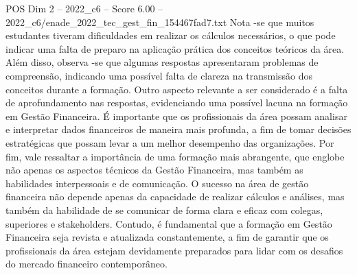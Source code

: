 \begin{textsample}{POS Dim 2 – 2022\_c6 – Score 6.00 – 2022\_c6/enade\_2022\_tec\_gest\_fin\_154467fad7.txt}
Nota -se que muitos estudantes tiveram dificuldades em realizar os cálculos necessários, o que pode indicar uma falta de preparo na aplicação prática dos conceitos teóricos da área.
Além disso, observa -se que algumas respostas apresentaram problemas de compreensão, indicando uma possível falta de clareza na transmissão dos conceitos durante a formação.
Outro aspecto relevante a ser considerado é a falta de aprofundamento nas respostas, evidenciando uma possível lacuna na formação em Gestão Financeira.
É importante que os profissionais da área possam analisar e interpretar dados financeiros de maneira mais profunda, a fim de tomar decisões estratégicas que possam levar a um melhor desempenho das organizações.
Por fim, vale ressaltar a importância de uma formação mais abrangente, que englobe não apenas os aspectos técnicos da Gestão Financeira, mas também as habilidades interpessoais e de comunicação.
O sucesso na área de gestão financeira não depende apenas da capacidade de realizar cálculos e análises, mas também da habilidade de se comunicar de forma clara e eficaz com colegas, superiores e stakeholders.
Contudo, é fundamental que a formação em Gestão Financeira seja revista e atualizada constantemente, a fim de garantir que os profissionais da área estejam devidamente preparados para lidar com os desafios do mercado financeiro contemporâneo.

\end{textsample}

